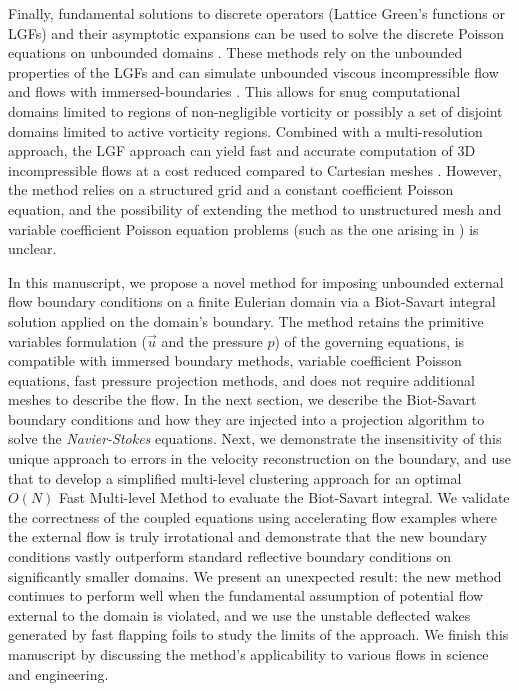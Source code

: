 \documentclass[11pt]{article}
\begin{document}
Finally, fundamental solutions to discrete operators (Lattice Green's functions or LGFs) and their asymptotic expansions can be used to solve the discrete Poisson equations on unbounded domains \cite{Liska2014AEquations, Beckers2022PlanarGrids}. 
These methods rely on the unbounded properties of the LGFs and can simulate unbounded viscous incompressible flow \cite{Liska2016ADomains} and flows with immersed-boundaries \cite{Liska2017AFunctions}. This allows for snug computational domains limited to regions of non-negligible vorticity or possibly a set of disjoint domains limited to active vorticity regions. Combined with a multi-resolution approach, the LGF approach can yield fast and accurate computation of 3D incompressible flows at a cost reduced compared to Cartesian meshes \cite{Dorschner2020AEquations}. However, the method relies on a structured grid and a constant coefficient Poisson equation, and the possibility of extending the method to unstructured mesh and variable coefficient Poisson equation problems (such as the one arising in \cite{Lauber2022}) is unclear.

In this manuscript, we propose a novel method for imposing unbounded external flow boundary conditions on a finite Eulerian domain via a Biot-Savart integral solution applied on the domain's boundary.
The method retains the primitive variables formulation ($\vec u$ and the pressure $p$) of the governing equations, is compatible with immersed boundary methods, variable coefficient Poisson equations, fast pressure projection methods, and does not require additional meshes to describe the flow. In the next section, we describe the Biot-Savart boundary conditions and how they are injected into a projection algorithm to solve the \emph{Navier-Stokes} equations. Next, we demonstrate the insensitivity of this unique approach to errors in the velocity reconstruction on the boundary, and use that to develop a simplified multi-level clustering approach for an optimal $O(N)$ Fast Multi-level Method to evaluate the Biot-Savart integral. We validate the correctness of the coupled equations using accelerating flow examples where the external flow is truly irrotational and demonstrate that the new boundary conditions vastly outperform standard reflective boundary conditions on significantly smaller domains. We present an unexpected result: the new method continues to perform well when the fundamental assumption of potential flow external to the domain is violated, and we use the unstable deflected wakes generated by fast flapping foils to study the limits of the approach. We finish this manuscript by discussing the method's applicability to various flows in science and engineering.
\end{document}

